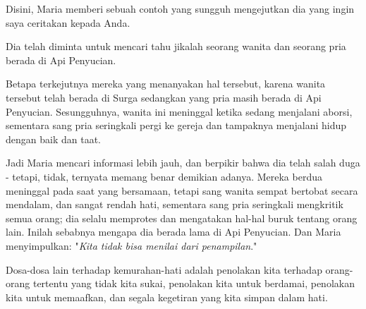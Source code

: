 






Disini, Maria memberi sebuah contoh yang sungguh mengejutkan dia yang ingin saya ceritakan kepada Anda.

Dia telah diminta untuk mencari tahu jikalah seorang wanita dan seorang pria berada di Api Penyucian.

Betapa terkejutnya mereka yang menanyakan hal tersebut, karena wanita tersebut telah berada di Surga sedangkan yang pria masih berada di Api Penyucian. Sesungguhnya, wanita ini meninggal ketika sedang menjalani aborsi, sementara sang pria seringkali pergi ke gereja dan tampaknya menjalani hidup dengan baik dan taat.

Jadi Maria mencari informasi lebih jauh, dan berpikir bahwa dia telah salah duga - tetapi, tidak, ternyata memang benar demikian adanya. Mereka berdua meninggal pada saat yang bersamaan, tetapi sang wanita sempat bertobat secara mendalam, dan sangat rendah hati, sementara sang pria seringkali mengkritik semua orang; dia selalu memprotes dan mengatakan hal-hal buruk tentang orang lain. Inilah sebabnya mengapa dia berada lama di Api Penyucian. Dan Maria menyimpulkan: "\textit{Kita tidak bisa menilai dari penampilan}."

Dosa-dosa lain terhadap kemurahan-hati adalah penolakan kita terhadap orang-orang tertentu yang tidak kita sukai, penolakan kita untuk berdamai, penolakan kita untuk memaafkan, dan segala kegetiran yang kita simpan dalam hati.

